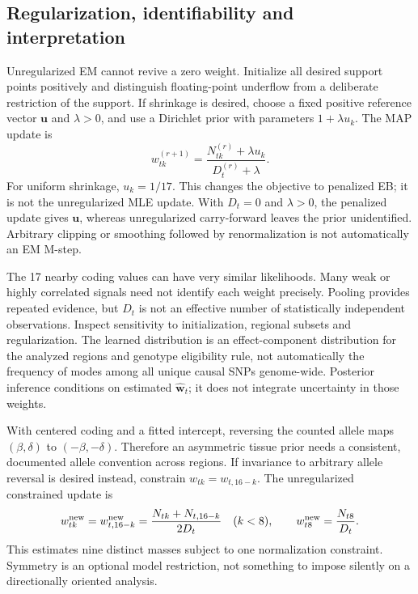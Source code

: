 \documentclass[11pt]{article}
\begin{document}
\subsection{Regularization, identifiability and interpretation}
Unregularized EM cannot revive a zero weight. Initialize all desired
support points positively and distinguish floating-point underflow from
a deliberate restriction of the support. If shrinkage is desired, choose
a fixed positive reference vector $\mathbf u$ and $\lambda>0$, and use
a Dirichlet prior with parameters $1+\lambda u_k$. The MAP update is
\begin{equation}
 w_{tk}^{(r+1)}
 =\frac{N_{tk}^{(r)}+\lambda u_k}{D_t^{(r)}+\lambda}.
 \label{eq:tissue-regularized}
\end{equation}
For uniform shrinkage, $u_k=1/17$. This changes the objective to penalized
EB; it is not the unregularized MLE update. With $D_t=0$ and $\lambda>0$,
the penalized update gives $\mathbf u$, whereas unregularized carry-forward
leaves the prior unidentified. Arbitrary clipping or smoothing followed by
renormalization is not automatically an EM M-step.

The 17 nearby coding values can have very similar likelihoods. Many weak
or highly correlated signals need not identify each weight precisely.
Pooling provides repeated evidence, but $D_t$ is not an effective number
of statistically independent observations. Inspect sensitivity to
initialization, regional subsets and regularization. The learned distribution
is an effect-component distribution for the analyzed regions and genotype
eligibility rule, not automatically the frequency of modes among all
unique causal SNPs genome-wide. Posterior inference conditions on estimated
$\widehat{\mathbf w}_t$; it does not integrate uncertainty in those weights.

With centered coding and a fitted intercept, reversing the counted allele
maps $(\beta,\delta)$ to $(-\beta,-\delta)$. Therefore an asymmetric tissue
prior needs a consistent, documented allele convention across regions.
If invariance to arbitrary allele reversal is desired instead, constrain
$w_{tk}=w_{t,16-k}$. The unregularized constrained update is
\begin{equation}
 w_{tk}^{\rm new}=w_{t,16-k}^{\rm new}
 =\frac{N_{tk}+N_{t,16-k}}{2D_t}\quad(k<8),
 \qquad w_{t8}^{\rm new}=\frac{N_{t8}}{D_t}.
 \label{eq:tissue-symmetric}
\end{equation}
This estimates nine distinct masses subject to one normalization constraint.
Symmetry is an optional model restriction, not something to impose silently
on a directionally oriented analysis.
\end{document}
